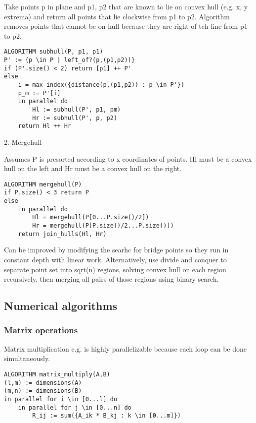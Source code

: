 Take points p in plane and p1, p2 that are known to lie on convex hull (e.g. x, y extrema) and return all points that lie clockwise from p1 to p2. Algorithm removes points that cannot be on hull because they are right of teh line from p1 to p2. 

\begin{lstlisting}
ALGORITHM subhull(P, p1, p1)
P' := {p \in P | left_of?(p,(p1,p2))}
if (P'.size() < 2) return [p1] ++ P'
else
    i = max_index({distance(p,(p1,p2)) : p \in P'})
    p_m := P'[i]
    in parallel do
        Hl := subhull(P', p1, pm)
        Hr := subhull(P', p, p2)
    return Hl ++ Hr
\end{lstlisting}

2. Mergehull

Assumes P is presorted according to x coordinates of points. Hl must be a convex hull on the left and Hr must be a convex hull on the right. 

\begin{lstlisting}
ALGORITHM mergehull(P)
if P.size() < 3 return P
else 
    in parallel do
        Hl = mergehull(P[0...P.size()/2])
        Hr = mergehull(P[P.size()/2...P.size()])
    return join_hulls(Hl, Hr)
\end{lstlisting}

Can be improved by modifying the searhc for bridge points so they run in constant depth with linear work. Alternatively, use divide and conquer to separate point set into sqrt(n) regions, solving convex hull on each region recursively, then merging all pairs of those regions using binary search.

\subsection{Numerical algorithms}

\subsubsection{Matrix operations}

Matrix multiplication e.g. is highly parallelizable because each loop can be done simultaneously. 

\begin{lstlisting}
ALGORITHM matrix_multiply(A,B)
(l,m) := dimensions(A)
(m,n) := dimensions(B)
in parallel for i \in [0...l] do
    in parallel for j \in [0...n] do
        R_ij := sum({A_ik * B_kj : k \in [0...m]})
\end{lstlisting}

